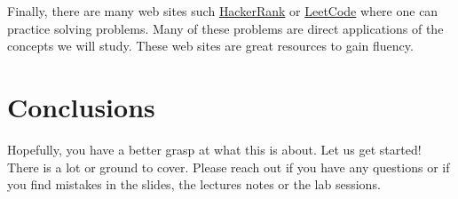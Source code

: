 \documentclass{aldast}
\begin{document}
Finally, there are many web sites such
\href{http://www.hackerrank.com}{HackerRank} or
\href{https://leetcode.com}{LeetCode} where one can practice solving
problems. Many of these problems are direct applications of the
concepts we will study. These web sites are great resources to gain
fluency.


\section*{Conclusions}
Hopefully, you have a better grasp at what this is about. Let us get
started! There is a lot or ground to cover. Please reach out if you
have any questions or if you find mistakes in the slides, the lectures
notes or the lab sessions.



\end{document}
